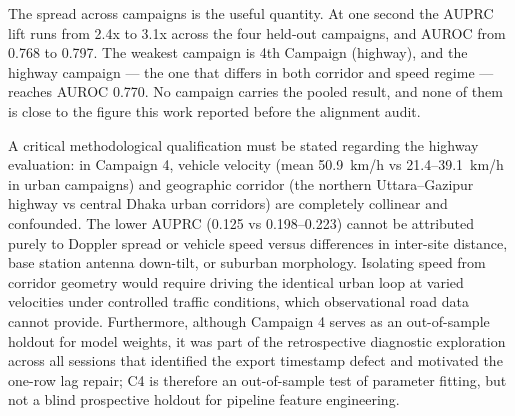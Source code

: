 \begin{table}[htbp]
\centering
\caption{Leave-one-campaign-out performance of LightGBM at the one-second horizon (tuned arm, corrected parser). Exploratory: Campaign 4 is held out for model fitting but not blind to the alignment repair (Section~\ref{sec:3_2}).}
\label{tab:5_8}
\vspace{0.4em}
\singlespacing
\footnotesize
{}
\end{table}

The spread across campaigns is the useful quantity. At one second the AUPRC lift runs from 2.4x to 3.1x across the four held-out campaigns, and AUROC from 0.768 to 0.797. The weakest campaign is 4th Campaign (highway), and the highway campaign --- the one that differs in both corridor and speed regime --- reaches AUROC 0.770. No campaign carries the pooled result, and none of them is close to the figure this work reported before the alignment audit.

A critical methodological qualification must be stated regarding the highway evaluation: in Campaign 4, vehicle velocity (mean 50.9~km/h vs 21.4--39.1~km/h in urban campaigns) and geographic corridor (the northern Uttara--Gazipur highway vs central Dhaka urban corridors) are completely collinear and confounded. The lower AUPRC (0.125 vs 0.198--0.223) cannot be attributed purely to Doppler spread or vehicle speed versus differences in inter-site distance, base station antenna down-tilt, or suburban morphology. Isolating speed from corridor geometry would require driving the identical urban loop at varied velocities under controlled traffic conditions, which observational road data cannot provide. Furthermore, although Campaign 4 serves as an out-of-sample holdout for model weights, it was part of the retrospective diagnostic exploration across all sessions that identified the export timestamp defect and motivated the one-row lag repair; C4 is therefore an out-of-sample test of parameter fitting, but not a blind prospective holdout for pipeline feature engineering.

